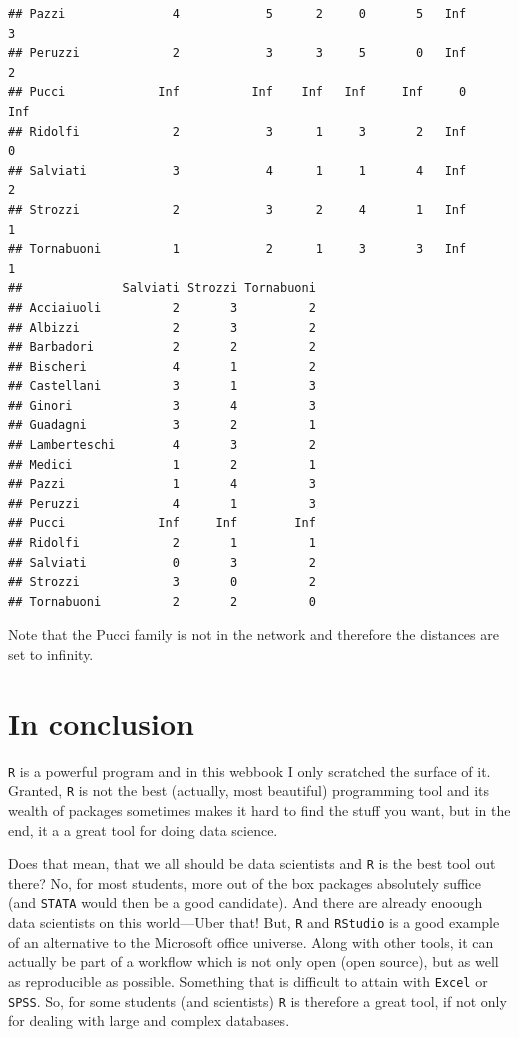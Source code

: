 \documentclass[]{article}
\theoremstyle{definition}
\theoremstyle{definition}
\theoremstyle{definition}
\theoremstyle{remark}
\begin{document}
\begin{verbatim}
## Pazzi               4            5      2     0       5   Inf       3
## Peruzzi             2            3      3     5       0   Inf       2
## Pucci             Inf          Inf    Inf   Inf     Inf     0     Inf
## Ridolfi             2            3      1     3       2   Inf       0
## Salviati            3            4      1     1       4   Inf       2
## Strozzi             2            3      2     4       1   Inf       1
## Tornabuoni          1            2      1     3       3   Inf       1
##              Salviati Strozzi Tornabuoni
## Acciaiuoli          2       3          2
## Albizzi             2       3          2
## Barbadori           2       2          2
## Bischeri            4       1          2
## Castellani          3       1          3
## Ginori              3       4          3
## Guadagni            3       2          1
## Lamberteschi        4       3          2
## Medici              1       2          1
## Pazzi               1       4          3
## Peruzzi             4       1          3
## Pucci             Inf     Inf        Inf
## Ridolfi             2       1          1
## Salviati            0       3          2
## Strozzi             3       0          2
## Tornabuoni          2       2          0
\end{verbatim}

Note that the Pucci family is not in the network and therefore the
distances are set to infinity.

\section{In conclusion}\label{in-conclusion}

\texttt{R} is a powerful program and in this webbook I only scratched
the surface of it. Granted, \texttt{R} is not the best (actually, most
beautiful) programming tool and its wealth of packages sometimes makes
it hard to find the stuff you want, but in the end, it a a great tool
for doing data science.

Does that mean, that we all should be data scientists and \texttt{R} is
the best tool out there? No, for most students, more out of the box
packages absolutely suffice (and \texttt{STATA} would then be a good
candidate). And there are already enoough data scientists on this
world---Uber that! But, \texttt{R} and \texttt{RStudio} is a good
example of an alternative to the Microsoft office universe. Along with
other tools, it can actually be part of a workflow which is not only
open (open source), but as well as reproducible as possible. Something
that is difficult to attain with \texttt{Excel} or \texttt{SPSS}. So,
for some students (and scientists) \texttt{R} is therefore a great tool,
if not only for dealing with large and complex databases.
\end{document}
